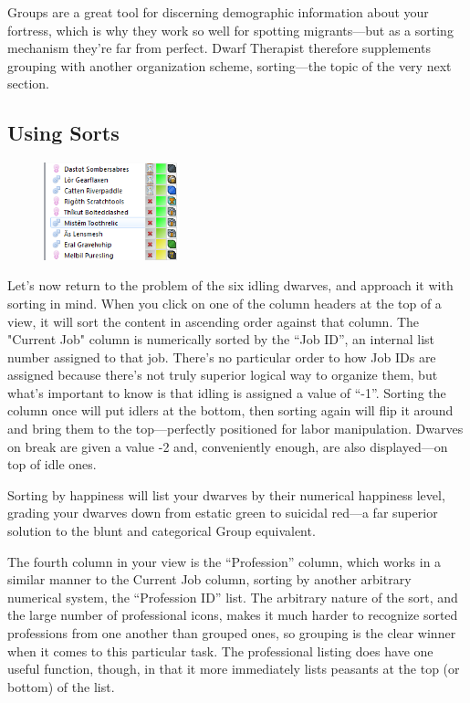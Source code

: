 \documentclass[]{article}
\begin{document}
Groups are a great tool for discerning demographic information about your fortress, which is why they
work so well for spotting migrants---but as a sorting mechanism they're far from perfect. Dwarf
Therapist therefore supplements grouping with another organization scheme, sorting---the topic of the
very next section.

\newpage
\subsection{Using Sorts}
\label{sec:Using Sorts}
\begin{figure}
\vspace{-20pt}
  \begin{center}
    \includegraphics[width=0.35\textwidth]{Sec2Fig10}
  \end{center}
\vspace{-10pt}
\end{figure}
Let's now return to the problem of the six idling dwarves, and approach it with sorting in mind. When you
click on one of the column headers at the top of a view, it will sort the content in ascending order
against that column. The "Current Job" column is numerically sorted by the ``Job ID'', an internal list
number assigned to that job. There's no particular order to how Job IDs are assigned because there's not
truly superior logical way to organize them, but what's important to know is that idling is assigned a
value of ``-1''. Sorting the column once will put idlers at the bottom, then sorting again will flip it
around and bring them to the top---perfectly positioned for labor manipulation. Dwarves on break are
given a value -2 and, conveniently enough, are also displayed---on top of idle ones.

Sorting by happiness will list your dwarves by their numerical happiness level, grading your dwarves
down from estatic green to suicidal red---a far superior solution to the blunt and categorical Group
equivalent.

The fourth column in your view is the ``Profession'' column, which works in a similar manner to the
Current Job column, sorting by another arbitrary numerical system, the ``Profession ID'' list. The
arbitrary nature of the sort, and the large number of professional icons, makes it much harder to
recognize sorted professions from one another than grouped ones, so grouping is the clear winner when it
comes to this particular task. The professional listing does have one useful function, though, in that
it more immediately lists peasants at the top (or bottom) of the list.
\end{document}
